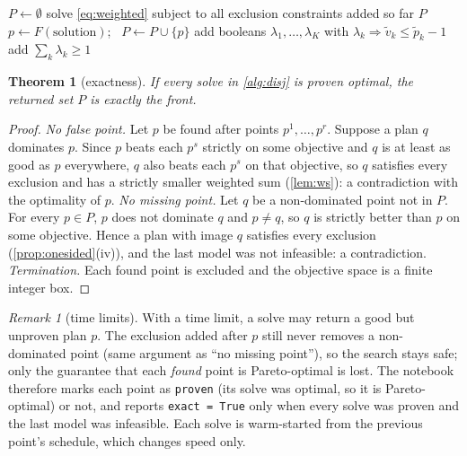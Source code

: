 \documentclass[10pt,a4paper]{article}
\theoremstyle{plain}
\newtheorem{theorem}[proposition]{Theorem}
\theoremstyle{definition}
\theoremstyle{remark}
\newtheorem*{remark}{Remark}
\begin{document}
\begin{algorithm}[H]
\caption{Disjunctive exclusion}\label{alg:disj}
\begin{algorithmic}[1]
\State $P\gets\emptyset$
\Loop
  \State solve \eqref{eq:weighted} subject to all exclusion constraints added so far
   \Return $P$ \EndIf
  \State $p\gets F(\text{solution})$; \ $P\gets P\cup\{p\}$
  \State add booleans $\lambda_1,\dots,\lambda_K$ with $\lambda_k \Rightarrow \tilde v_k\le \tilde p_k-1$
  \State add $\sum_k\lambda_k\ge1$ 
\EndLoop
\end{algorithmic}
\end{algorithm}

\begin{theorem}[exactness]\label{thm:exact}
If every solve in \cref{alg:disj} is proven optimal, the returned set $P$ is exactly the front.
\end{theorem}
\begin{proof}
\emph{No false point.} Let $p$ be found after points $p^1,\dots,p^r$. Suppose a plan $q$ dominates
$p$. Since $p$ beats each $p^s$ strictly on some objective and $q$ is at least as good as $p$
everywhere, $q$ also beats each $p^s$ on that objective, so $q$ satisfies every exclusion and has a
strictly smaller weighted sum (\cref{lem:ws}): a contradiction with the optimality of $p$.
\emph{No missing point.} Let $q$ be a non-dominated point not in $P$. For every $p\in P$, $p$ does
not dominate $q$ and $p\neq q$, so $q$ is strictly better than $p$ on some objective. Hence a plan
with image $q$ satisfies every exclusion (\cref{prop:onesided}(iv)), and the last model was not
infeasible: a contradiction.
\emph{Termination.} Each found point is excluded and the objective space is a finite integer box.
\end{proof}

\begin{remark}[time limits]
With a time limit, a solve may return a good but unproven plan $p$. The exclusion added after $p$
still never removes a non-dominated point (same argument as ``no missing point''), so the search
stays safe; only the guarantee that each \emph{found} point is Pareto-optimal is lost. The notebook
therefore marks each point as \texttt{proven} (its solve was optimal, so it is Pareto-optimal) or
not, and reports \texttt{exact = True} only when every solve was proven and the last model was
infeasible. Each solve is warm-started from the previous point's schedule, which changes speed
only.
\end{remark}
\end{document}
